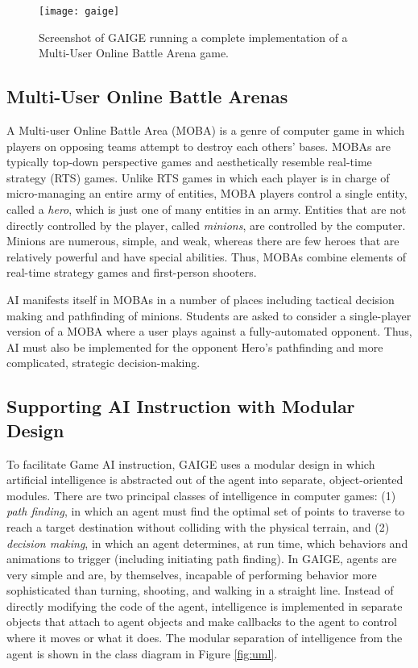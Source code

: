 \documentclass[letterpaper]{article}
\begin{document}
\begin{figure}
\texttt{[image: gaige]}
\caption{Screenshot of GAIGE running a complete implementation of a Multi-User Online Battle Arena game.}
\label{fig:gaige}
\end{figure}



\subsection{Multi-User Online Battle Arenas}

A Multi-user Online Battle Area (MOBA) is a genre of computer game in which players on opposing teams attempt to destroy each others' bases. 
MOBAs are typically top-down perspective games and aesthetically resemble real-time strategy (RTS) games. 
Unlike RTS games in which each player is in charge of micro-managing an entire army of entities, MOBA players control a single entity, called a {\em hero}, which is just one of many entities in an army.
Entities that are not directly controlled by the player, called {\em minions}, are controlled by the computer. 
Minions are numerous, simple, and weak, whereas there are few heroes that are relatively powerful and have special abilities.
Thus, MOBAs combine elements of real-time strategy games and first-person shooters. 

AI manifests itself in MOBAs in a number of places including tactical decision making and pathfinding of minions.
Students are asked to consider a single-player version of a MOBA where a user plays against a fully-automated opponent.
Thus, AI must also be implemented for the opponent Hero's pathfinding and more complicated, strategic decision-making.




\subsection{Supporting AI Instruction with Modular Design}

To facilitate Game AI instruction, GAIGE uses a modular design in which artificial intelligence is abstracted out of the agent into separate, object-oriented modules.
There are two principal classes of intelligence in computer games: (1) {\em path finding}, in which an agent must find the optimal set of points to traverse to reach a target destination without colliding with the physical terrain, and (2) {\em decision making}, in which an agent determines, at run time, which behaviors and animations to trigger (including initiating path finding). 
In GAIGE, agents are very simple and are, by themselves, incapable of performing behavior more sophisticated than turning, shooting, and walking in a straight line. 
Instead of directly modifying the code of the agent, intelligence is implemented in separate objects that attach to agent objects and make callbacks to the agent to control where it moves or what it does.
The modular separation of intelligence from the agent is shown in the class diagram in Figure \ref{fig:uml}.
\end{document}
